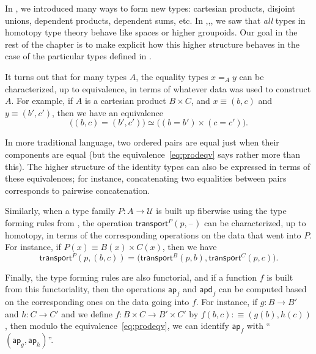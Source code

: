 \documentclass[12pt]{article}
\newcommand{\blank}{\mathord{\hspace{1pt}\text{--}\hspace{1pt}}}
\newcommand{\defeq}{\vcentcolon\equiv}
\newcommand{\eqv}[2]{\ensuremath{#1 \simeq #2}\xspace}
\newcommand{\id}[3][]{\ensuremath{#2 =_{#1} #3}\xspace}
\newcommand{\jdeq}{\equiv}
\newcommand{\mapdepfunc}[1]{\ensuremath{\mathsf{apd}_{#1}}\xspace}
\newcommand{\mapfunc}[1]{\ensuremath{\mathsf{ap}_{#1}}\xspace}
\newcommand{\transfib}[3]{\ensuremath{\mathsf{transport}^{#1}(#2,#3)\xspace}}
\newcommand{\UU}{\ensuremath{\mathcal{U}}\xspace}
\newcommand{\vcentcolon}{:\!\!}
\newcounter{mathcount}
\newenvironment{myeqn}{\begin{equation}}{\end{equation}\addtocounter{mathcount}{1}}
\let\apdfunc\mapdepfunc
\let\apfunc\mapfunc
\let\type\UU
\begin{document}
In , we introduced many ways to form new types: cartesian products, disjoint unions, dependent products, dependent sums, etc.
In ,,, we saw that \emph{all} types in homotopy type theory behave like spaces or higher groupoids.
Our goal in the rest of the chapter is to make explicit how this higher structure behaves in the case of the particular types defined in .

It turns out that for many types $A$, the equality types $\id[A]xy$ can be characterized, up to equivalence, in terms of whatever data was used to construct $A$.
For example, if $A$ is a cartesian product $B\times C$, and $x\jdeq (b,c)$ and $y\jdeq(b',c')$, then we have an equivalence
\begin{myeqn}\label{eq:prodeqv}
  \eqv{\big((b,c)=(b',c')\big)}{\big((b=b')\times (c=c')\big)}.
\end{myeqn}
In more traditional language, two ordered pairs are equal just when their components are equal (but the equivalence~\eqref{eq:prodeqv} says rather more than this).
The higher structure of the identity types can also be expressed in terms of these equivalences; for instance, concatenating two equalities between pairs corresponds to pairwise concatenation.

Similarly, when a type family $P:A\to\type$ is built up fiberwise using the type forming rules from , the operation $\transfib{P}{p}{\blank}$ can be characterized, up to homotopy, in terms of the corresponding operations on the data that went into $P$.
For instance, if $P(x) \jdeq B(x)\times C(x)$, then we have
\[\transfib{P}{p}{(b,c)} = \big(\transfib{B}{p}{b},\transfib{C}{p}{c}\big).\]

Finally, the type forming rules are also functorial, and if a function $f$ is built from this functoriality, then the operations $\apfunc f$ and $\apdfunc f$ can be computed based on the corresponding ones on the data going into $f$.
For instance, if $g:B\to B'$ and $h:C\to C'$ and we define $f:B\times C \to B'\times C'$ by $f(b,c)\defeq (g(b),h(c))$, then modulo the equivalence~\eqref{eq:prodeqv}, we can identify $\apfunc f$ with ``$(\apfunc g,\apfunc h)$''.
\end{document}
